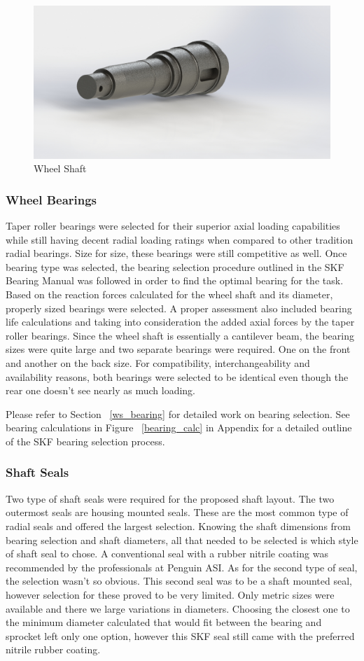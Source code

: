 \begin{figure}[h]\centering
	\includegraphics[width=.7\linewidth]{dom/shaft_iso_rndr.jpg}
	\caption{Wheel Shaft}
	\label{fig:wheel_shaft}
\end{figure}

\subsubsection{Wheel Bearings}
Taper roller bearings were selected for their superior axial loading capabilities while still having decent radial loading ratings when compared to other tradition radial bearings. Size for size, these bearings were still competitive as well. Once bearing type was selected, the bearing selection procedure outlined in the SKF Bearing Manual was followed in order to find the optimal bearing for the task. Based on the reaction forces calculated for the wheel shaft and its diameter, properly sized bearings were selected. A proper assessment also included bearing life calculations and taking into consideration the added axial forces by the taper roller bearings. Since the wheel shaft is essentially a cantilever beam, the bearing sizes were quite large and two separate bearings were required. One on the front and another on the back size. For compatibility, interchangeability and availability reasons, both bearings were selected to be identical even though the rear one doesn't see nearly as much loading.

Please refer to Section ~\ref{ws_bearing} for detailed work on bearing selection. See bearing calculations in Figure ~\ref{bearing_calc} in Appendix for a detailed outline of the SKF bearing selection process.

\subsubsection{Shaft Seals}
Two type of shaft seals were required for the proposed shaft layout. The two outermost seals are housing mounted seals. These are the most common type of radial seals and offered the largest selection. Knowing the shaft dimensions from bearing selection and shaft diameters, all that needed to be selected is which style of shaft seal to chose. A conventional seal with a rubber nitrile coating was recommended by the professionals at Penguin ASI. As for the second type of seal, the selection wasn't so obvious. This second seal was to be a shaft mounted seal, however selection for these proved to be very limited. Only metric sizes were available and there we large variations in diameters. Choosing the closest one to the minimum diameter calculated that would fit between the bearing and sprocket left only one option, however this SKF seal still came with the preferred nitrile rubber coating.

